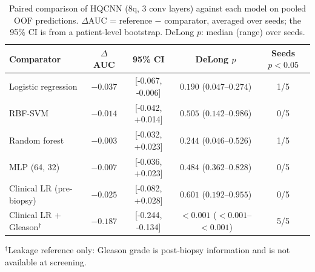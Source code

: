 \begin{table}[t]
\centering
\caption{Paired comparison of HQCNN (8q, 3 conv layers) against each model on pooled OOF predictions. $\Delta$AUC = reference $-$ comparator, averaged over seeds; the 95\% CI is from a patient-level bootstrap. DeLong $p$: median (range) over seeds.}
\label{tab:v3_delong}
\small
\begin{tabular}{lcccc}
\toprule
Comparator & $\Delta$AUC & 95\% CI & DeLong $p$ & Seeds $p<0.05$ \\
\midrule
Logistic regression & $-0.037$ & [-0.067, -0.006] & $0.190$ ($0.047$--$0.274$) & 1/5 \\
RBF-SVM & $-0.014$ & [-0.042, +0.014] & $0.505$ ($0.142$--$0.986$) & 0/5 \\
Random forest & $-0.003$ & [-0.032, +0.023] & $0.244$ ($0.046$--$0.526$) & 1/5 \\
MLP (64, 32) & $-0.007$ & [-0.036, +0.023] & $0.484$ ($0.362$--$0.828$) & 0/5 \\
Clinical LR (pre-biopsy) & $-0.025$ & [-0.082, +0.028] & $0.601$ ($0.192$--$0.955$) & 0/5 \\
Clinical LR + Gleason$^{\dagger}$ & $-0.187$ & [-0.244, -0.134] & $<0.001$ ($<0.001$--$<0.001$) & 5/5 \\
\bottomrule
\end{tabular}
\par\smallskip\footnotesize $^{\dagger}$Leakage reference only: Gleason grade is post-biopsy information and is not available at screening.
\end{table}
